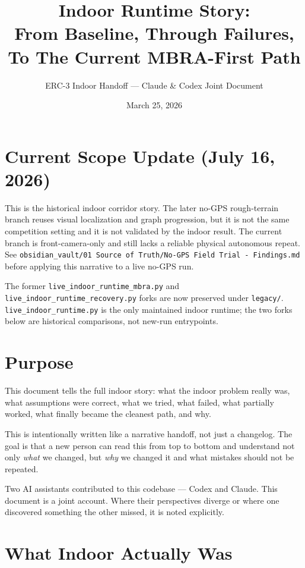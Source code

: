 \documentclass[11pt]{article}
\title{Indoor Runtime Story:\\From Baseline, Through Failures, To The Current MBRA-First Path}
\author{ERC-3 Indoor Handoff — Claude \& Codex Joint Document}
\date{March 25, 2026}
\begin{document}
\maketitle
\tableofcontents
\newpage

\section*{Current Scope Update (July 16, 2026)}
This is the historical indoor corridor story. The later no-GPS rough-terrain
branch reuses visual localization and graph progression, but it is not the same
competition setting and it is not validated by the indoor result. The current
branch is front-camera-only and still lacks a reliable physical autonomous
repeat. See
\texttt{obsidian\_vault/01 Source of Truth/No-GPS Field Trial - Findings.md}
before applying this narrative to a live no-GPS run.

The former \texttt{live\_indoor\_runtime\_mbra.py} and
\texttt{live\_indoor\_runtime\_recovery.py} forks are now preserved under
\texttt{legacy/}. \texttt{live\_indoor\_runtime.py} is the only maintained
indoor runtime; the two forks below are historical comparisons, not new-run
entrypoints.

\section{Purpose}

This document tells the full indoor story: what the indoor problem really was, what assumptions were correct, what we tried, what failed, what partially worked, what finally became the cleanest path, and why.

This is intentionally written like a narrative handoff, not just a changelog. The goal is that a new person can read this from top to bottom and understand not only \emph{what} we changed, but \emph{why} we changed it and what mistakes should not be repeated.

Two AI assistants contributed to this codebase --- Codex and Claude. This document is a joint account. Where their perspectives diverge or where one discovered something the other missed, it is noted explicitly.


\section{What Indoor Actually Was}
\end{document}
